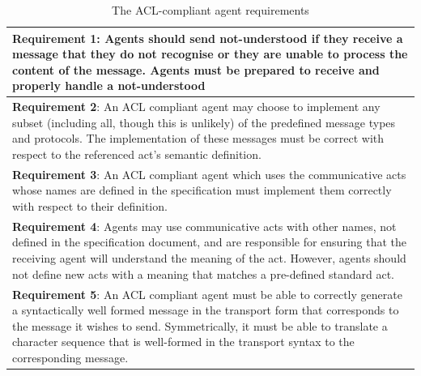 \documentclass[main.tex]{subfiles}
\begin{document}
\begin{table}[htbp]
    \caption{The ACL-compliant agent requirements \cite{IntelligentPhysicalAgents2001}}
    \renewcommand{\arraystretch}{1.7}
    \centering\begin{tabular}{p{}}
\toprule
\textbf{Requirement 1}:
Agents should send not-understood if they receive a message that they do not recognise or they are unable to
process the content of the message. Agents must be prepared to receive and properly handle a not-understood
\\\midrule
\textbf{Requirement 2}:
An ACL compliant agent may choose to implement any subset (including all, though this is
unlikely) of the predefined message types and protocols. The implementation of these messages
must be correct with respect to the referenced act's semantic definition.
 \\\midrule
\textbf{Requirement 3}:
An ACL compliant agent which uses the communicative acts whose names are defined in the specification must
implement them correctly with respect to their definition.
\\\midrule
\textbf{Requirement 4}:
Agents may use communicative acts with other names, not defined in the specification document,
and are responsible for ensuring that the receiving agent will understand the meaning of the
act. However, agents should not define new acts with a meaning that matches a pre-defined
standard act.
 \\\midrule
\textbf{Requirement 5}:
An ACL compliant agent must be able to correctly generate a syntactically well formed message in the transport
form that corresponds to the message it wishes to send. Symmetrically, it must be able to translate a character
sequence that is well-formed in the transport syntax to the corresponding message.
\\\bottomrule
    \end{tabular}
    \label{requirements}
\end{table}
\end{document}
